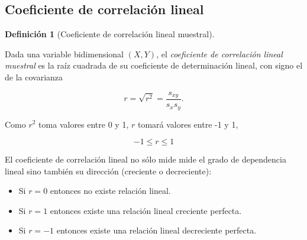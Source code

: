 \documentclass[
  spanish,
  a4paper,
]{scrreport}
\providecommand{\tightlist}{%
  \setlength{\itemsep}{0pt}\setlength{\parskip}{0pt}}
\theoremstyle{plain}
\theoremstyle{definition}
\theoremstyle{definition}
\newtheorem{definition}{Definición}[chapter]
\theoremstyle{remark}
\begin{document}
\subsection{Coeficiente de correlación
lineal}\label{coeficiente-de-correlaciuxf3n-lineal}

\begin{definition}[Coeficiente de correlación lineal
muestral]\protect\hypertarget{def-coeficiente-correlacion}{}\label{def-coeficiente-correlacion}

Dada una variable bidimensional \((X,Y)\), el \emph{coeficiente de
correlación lineal muestral} es la raíz cuadrada de su coeficiente de
determinación lineal, con signo el de la covarianza

\[
r = \sqrt{r^2} = \dfrac{s_{xy}}{s_xs_y}.
\]

\end{definition}

\begin{tcolorbox}[enhanced jigsaw, arc=.35mm, bottomrule=.15mm, bottomtitle=1mm, breakable, colback=white, colbacktitle=quarto-callout-warning-color!10!white, colframe=quarto-callout-warning-color-frame, coltitle=black, left=2mm, leftrule=.75mm, opacityback=0, opacitybacktitle=0.6, rightrule=.15mm, title=\textcolor{quarto-callout-warning-color}{\faExclamationTriangle}\hspace{0.5em}{Advertencia}, titlerule=0mm, toprule=.15mm, toptitle=1mm]

Como \(r^2\) toma valores entre 0 y 1, \(r\) tomará valores entre -1 y
1,

\[-1\leq r\leq 1\]

\end{tcolorbox}

\begin{tcolorbox}[enhanced jigsaw, arc=.35mm, bottomrule=.15mm, bottomtitle=1mm, breakable, colback=white, colbacktitle=quarto-callout-note-color!10!white, colframe=quarto-callout-note-color-frame, coltitle=black, left=2mm, leftrule=.75mm, opacityback=0, opacitybacktitle=0.6, rightrule=.15mm, title=\textcolor{quarto-callout-note-color}{\faInfo}\hspace{0.5em}{Interpretación}, titlerule=0mm, toprule=.15mm, toptitle=1mm]

El coeficiente de correlación lineal no sólo mide mide el grado de
dependencia lineal sino también su dirección (creciente o decreciente):

\begin{itemize}
\tightlist
\item
  Si \(r =0\) entonces no existe relación lineal.
\item
  Si \(r=1\) entonces existe una relación lineal creciente perfecta.
\item
  Si \(r=-1\) entonces existe una relación lineal decreciente perfecta.
\end{itemize}

\end{tcolorbox}
\end{document}
